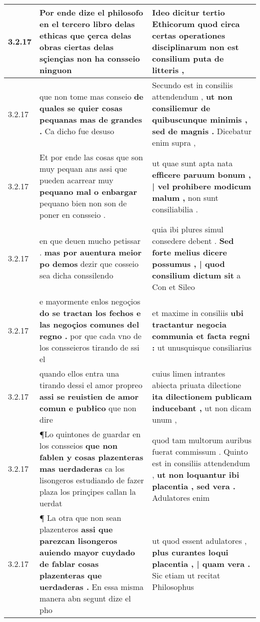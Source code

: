 \begin{tabular}{|p{1cm}|p{6.5cm}|p{6.5cm}|}
3.2.17 & Por ende dize el philosofo en el tercero libro delas ethicas \textbf{ que çerca delas obras ciertas delas sçiençias } non ha consseio ninguon & Ideo dicitur tertio Ethicorum \textbf{ quod circa certas operationes disciplinarum } non est consilium puta de litteris , \\\hline
3.2.17 & que non tome mas conseio \textbf{ de quales se quier cosas pequanas mas de grandes . } Ca dicho fue desuso & Secundo est in consiliis attendendum , \textbf{ ut non consiliemur de quibuscunque minimis , sed de magnis . } Dicebatur enim supra , \\\hline
3.2.17 & Et por ende las cosas que son muy pequan ans assi que pueden acarrear muy \textbf{ pequano mal o enbargar } pequano bien non son de poner en consseio . & ut quae sunt apta nata \textbf{ efficere paruum bonum , | vel prohibere modicum malum , } non sunt consiliabilia . \\\hline
3.2.17 & en que deuen mucho petissar . \textbf{ mas por auentura meior po demos } dezir que cosseio sea dicha conssilendo & quia ibi plures simul consedere debent . \textbf{ Sed forte melius dicere possumus , | quod consilium dictum sit } a Con et Sileo \\\hline
3.2.17 & e mayormente enlos negoçios \textbf{ do se tractan los fechos e las negoçios comunes del regno . } por que cada vno de los consseieros tirando de ssi el & et maxime in consiliis \textbf{ ubi tractantur negocia communia et facta regni : } ut unusquisque consiliarius \\\hline
3.2.17 & quando ellos entra una tirando dessi el amor propreo \textbf{ assi se reuistien de amor comun e pubłico } que non dire & cuius limen intrantes abiecta priuata dilectione \textbf{ ita dilectionem publicam inducebant , } ut non dicam unum , \\\hline
3.2.17 & ¶Lo quintones de guardar en los consseios \textbf{ que non fablen y cosas plazenteras mas uerdaderas } ca los lisongeros estudiando de fazer plaza los prinçipes callan la uerdat & quod tam multorum auribus fuerat commissum . Quinto est in consiliis attendendum , \textbf{ ut non loquantur ibi placentia , sed vera . } Adulatores enim \\\hline
3.2.17 & ¶ La otra que non sean plazenteros \textbf{ assi que parezcan lisongeros auiendo mayor cuydado de fablar cosas plazenteras que uerdaderas . } En essa misma manera abn segunt dize el pho & ut quod essent adulatores , \textbf{ plus curantes loqui placentia , | quam vera . } Sic etiam ut recitat Philosophus \\\hline

\end{tabular}
